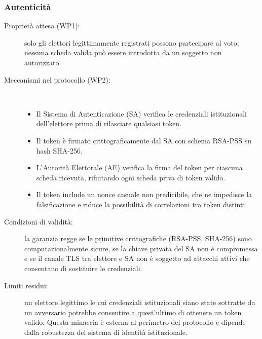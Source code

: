\documentclass[12pt,a4paper]{article}
\begin{document}
\subsubsection{Autenticità}
\begin{description}
  \item[Proprietà attesa (WP1):] solo gli elettori legittimamente registrati possono partecipare al voto; nessuna scheda valida può essere introdotta da un soggetto non autorizzato.
  \item[Meccanismi nel protocollo (WP2):] \
    \begin{itemize}
      \item Il Sistema di Autenticazione (SA) verifica le credenziali istituzionali dell'elettore prima di rilasciare qualsiasi token.
      \item Il token è firmato crittograficamente dal SA con schema RSA-PSS su hash SHA-256.
      \item L'Autorità Elettorale (AE) verifica la firma del token per ciascuna scheda ricevuta, rifiutando ogni scheda priva di token valido.
      \item Il token include un nonce casuale non predicibile, che ne impedisce la falsificazione e riduce la possibilità di correlazioni tra token distinti.
    \end{itemize}
  \item[Condizioni di validità:] la garanzia regge se le primitive crittografiche (RSA-PSS, SHA-256) sono computazionalmente sicure, se la chiave privata del SA non è compromessa e se il canale TLS tra elettore e SA non è soggetto ad attacchi attivi che consentano di sostituire le credenziali.
  \item[Limiti residui:] un elettore legittimo le cui credenziali istituzionali siano state sottratte da un avversario potrebbe consentire a quest'ultimo di ottenere un token valido. Questa minaccia è esterna al perimetro del protocollo e dipende dalla robustezza del sistema di identità istituzionale.
\end{description}
\end{document}
